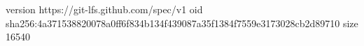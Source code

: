 version https://git-lfs.github.com/spec/v1
oid sha256:4a371538820078a0ff6f834b134f439087a35f1384f7559e3173028cb2d89710
size 16540
